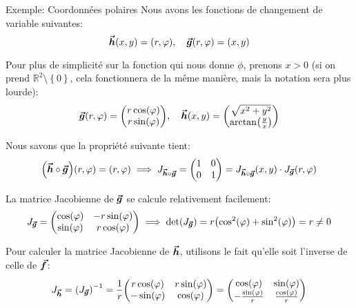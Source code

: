 \documentclass[a4paper]{article}
\begin{document}
\begin{parag}{Exemple: Coordonnées polaires}
    Nous avons les fonctions de changement de variable suivantes:
    \[\bvec{h}\left(x, y\right) = \left(r, \phi\right), \mathspace \bvec{g}\left(r, \phi\right) = \left(x, y\right)\]
    
    Pour plus de simplicité sur la fonction qui nous donne $\phi$, prenons $x > 0$ (si on prend $\mathbb{R}^2 \setminus \left\{0\right\}$, cela fonctionnera de la même manière, mais la notation sera plus lourde):
    \[\bvec{g}\left(r, \phi\right) = \begin{pmatrix} r\cos\left(\phi\right) \\ r\sin\left(\phi\right) \end{pmatrix}, \mathspace \bvec{h}\left(x, y\right) = \begin{pmatrix} \sqrt{x^2 + y^2} \\ \arctan\left(\frac{y}{x}\right) \end{pmatrix} \]
    
    Nous savons que la propriété suivante tient:
    \[\left(\bvec{h} \circ \bvec{g}\right)\left(r, \phi\right) = \left(r, \phi\right) \implies J_{\bvec{h} \circ \bvec{g}} = \begin{pmatrix} 1 & 0 \\ 0 & 1 \end{pmatrix} = J_{\bvec{h} \circ \bvec{g}}\left(x, y\right) \cdot J_{\bvec{g}}\left(r, \phi\right)\]

    La matrice Jacobienne de $\bm{\protect\vec{g}}$ se calcule relativement facilement:
    \[J_{\bvec{g}} = \begin{pmatrix} \cos\left(\phi\right) & -r\sin\left(\phi\right) \\ \sin\left(\phi\right) & r\cos\left(\phi\right) \end{pmatrix} \implies \det\left(J_{\bvec{g}}\right) = r\left(\cos^2\left(\phi\right) + \sin^2\left(\phi\right)\right) = r \neq 0\]

    Pour calculer la matrice Jacobienne de $\bm{\protect\vec{h}}$, utilisons le fait qu'elle soit l'inverse de celle de $\bm{\protect\vec{f}}$:
    \[J_{\bvec{h}}= \left(J_{\bvec{g}}\right)^{-1} = \frac{1}{r} \begin{pmatrix} r\cos\left(\phi\right) & r\sin\left(\phi\right) \\ -\sin\left(\phi\right) & \cos\left(\phi\right) \end{pmatrix} = \begin{pmatrix} \cos\left(\phi\right) & \sin\left(\phi\right) \\ -\frac{\sin\left(\phi\right)}{r} & \frac{\cos\left(\phi\right)}{r} \end{pmatrix} \]


\end{parag}
\end{document}
